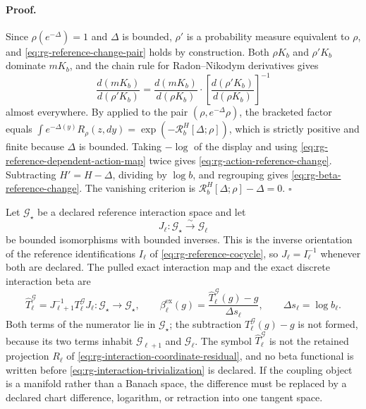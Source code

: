 \paragraph{Proof.}
Since $\rho(e^{-\Delta})=1$ and $\Delta$ is bounded, $\rho'$ is a probability
measure equivalent to $\rho$, and \eqref{eq:rg-reference-change-pair} holds by
construction.  Both $\rho K_b$ and $\rho'K_b$ dominate $mK_b$, and the chain
rule for Radon--Nikodym derivatives gives
\[
\frac{d(mK_b)}{d(\rho'K_b)}
=\frac{d(mK_b)}{d(\rho K_b)}
\cdot\left[\frac{d(\rho'K_b)}{d(\rho K_b)}\right]^{-1}
\]
almost everywhere.  By  applied to the pair
$(\rho,e^{-\Delta}\rho)$, the bracketed factor equals
$\int e^{-\Delta(y)}R_\rho(z,dy)=\exp(-\mathcal R_b^H[\Delta;\rho])$, which is
strictly positive and finite because $\Delta$ is bounded.  Taking $-\log$ of the
display and using \eqref{eq:rg-reference-dependent-action-map} twice gives
\eqref{eq:rg-action-reference-change}.  Subtracting
$H'=H-\Delta$, dividing by $\log b$, and regrouping gives
\eqref{eq:rg-beta-reference-change}.  The vanishing criterion is
$\mathcal R_b^H[\Delta;\rho]-\Delta=0$.  $\square$

Let $\mathcal G_\star$ be a declared reference interaction space and let
\begin{equation}
J_\ell:\mathcal G_\star\xrightarrow{\ \sim\ }\mathcal G_\ell
\label{eq:rg-interaction-trivialization}
\end{equation}
be bounded isomorphisms with bounded inverses.  This is the inverse orientation
of the reference identifications $I_\ell$ of
\eqref{eq:rg-reference-cocycle}, so $J_\ell=I_\ell^{-1}$ whenever both are
declared.  The pulled exact interaction map and the exact discrete interaction
beta are
\begin{equation}
\widehat T_\ell^{\mathcal G}
=J_{\ell+1}^{-1}T_\ell^{\mathcal G}J_\ell:
\mathcal G_\star\longrightarrow\mathcal G_\star,
\qquad
\beta_\ell^{\mathrm{ex}}(g)
=\frac{\widehat T_\ell^{\mathcal G}(g)-g}{\Delta s_\ell},
\qquad
\Delta s_\ell=\log b_\ell .
\label{eq:rg-interaction-beta}
\end{equation}
Both terms of the numerator lie in $\mathcal G_\star$; the subtraction
$T_\ell^{\mathcal G}(g)-g$ is not formed, because its two terms inhabit
$\mathcal G_{\ell+1}$ and $\mathcal G_\ell$.  The symbol
$\widehat T_\ell^{\mathcal G}$ is not the retained projection $R_\ell$ of
\eqref{eq:rg-interaction-coordinate-residual}, and no beta functional is written
before \eqref{eq:rg-interaction-trivialization} is declared.  If the coupling
object is a manifold rather than a Banach space, the difference must be replaced
by a declared chart difference, logarithm, or retraction into one tangent space.

